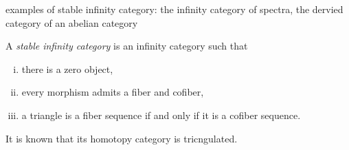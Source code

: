 \documentclass{../../large}
\begin{document}
examples of stable infinity category: the infinity category of spectra, the dervied category of an abelian category

\begin{prb}
A \emph{stable infinity category} is an infinity category such that
\begin{enumerate}[(i)]
\item there is a zero object,
\item every morphism admits a fiber and cofiber,
\item a triangle is a fiber sequence if and only if it is a cofiber sequence.
\end{enumerate}
It is known that its homotopy category is tricngulated.
\end{prb}

\begin{prb}
\end{prb}

\begin{prb}
\end{prb}
\end{document}
